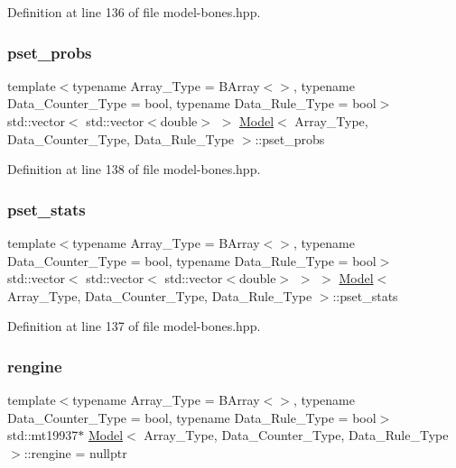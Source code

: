 Definition at line 136 of file model-\/bones.\+hpp.

\mbox{\label{class_model_a5dea24375889e55064f052fd8e8c4fe2}} 
\subsubsection{\texorpdfstring{pset\+\_\+probs}{pset\_probs}}
{\footnotesize\ttfamily template$<$typename Array\+\_\+\+Type = B\+Array$<$$>$, typename Data\+\_\+\+Counter\+\_\+\+Type = bool, typename Data\+\_\+\+Rule\+\_\+\+Type = bool$>$ \\
std\+::vector$<$ std\+::vector$<$double$>$ $>$ \hyperlink{class_model}{Model}$<$ Array\+\_\+\+Type, Data\+\_\+\+Counter\+\_\+\+Type, Data\+\_\+\+Rule\+\_\+\+Type $>$\+::pset\+\_\+probs}



Definition at line 138 of file model-\/bones.\+hpp.

\mbox{\label{class_model_a89fff457ecccc91a624e20cafbf3e765}} 
\subsubsection{\texorpdfstring{pset\+\_\+stats}{pset\_stats}}
{\footnotesize\ttfamily template$<$typename Array\+\_\+\+Type = B\+Array$<$$>$, typename Data\+\_\+\+Counter\+\_\+\+Type = bool, typename Data\+\_\+\+Rule\+\_\+\+Type = bool$>$ \\
std\+::vector$<$ std\+::vector$<$ std\+::vector$<$double$>$ $>$ $>$ \hyperlink{class_model}{Model}$<$ Array\+\_\+\+Type, Data\+\_\+\+Counter\+\_\+\+Type, Data\+\_\+\+Rule\+\_\+\+Type $>$\+::pset\+\_\+stats}



Definition at line 137 of file model-\/bones.\+hpp.

\mbox{\label{class_model_a0f890665302d545663698000cd13a73f}} 
\subsubsection{\texorpdfstring{rengine}{rengine}}
{\footnotesize\ttfamily template$<$typename Array\+\_\+\+Type = B\+Array$<$$>$, typename Data\+\_\+\+Counter\+\_\+\+Type = bool, typename Data\+\_\+\+Rule\+\_\+\+Type = bool$>$ \\
std\+::mt19937$\ast$ \hyperlink{class_model}{Model}$<$ Array\+\_\+\+Type, Data\+\_\+\+Counter\+\_\+\+Type, Data\+\_\+\+Rule\+\_\+\+Type $>$\+::rengine = nullptr}



